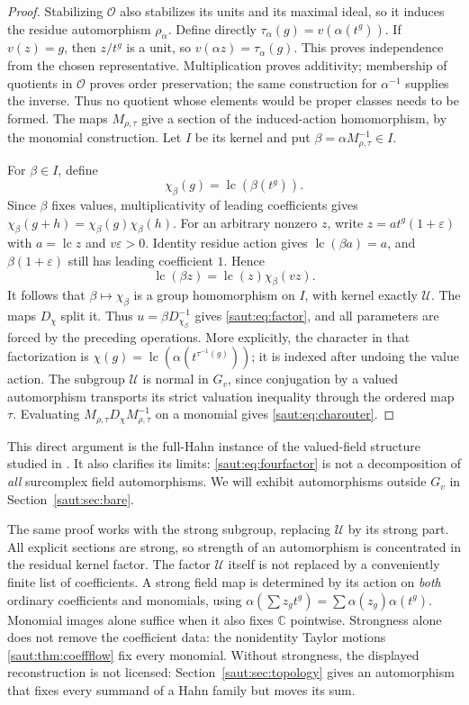 \documentclass[11pt]{article}
\theoremstyle{definition}
\theoremstyle{remark}
\newcommand{\C}{\mathbb C}
\newcommand{\OO}{\mathcal O}
\newcommand{\U}{\mathcal U}
\newcommand{\lc}{\operatorname{lc}}
\numberwithin{equation}{section}
\begin{document}
\begin{proof}
Stabilizing $\OO$ also stabilizes its units and its maximal ideal, so it
induces the residue automorphism $\rho_\alpha$. Define directly
$\tau_\alpha(g)=v(\alpha(t^g))$. If $v(z)=g$, then $z/t^g$ is a unit,
so $v(\alpha z)=\tau_\alpha(g)$. This proves independence from the chosen
representative. Multiplication proves additivity; membership of quotients
in $\OO$ proves order preservation; the same construction for
$\alpha^{-1}$ supplies the inverse. Thus no quotient whose elements would
be proper classes needs to be formed.
The maps $M_{\rho,\tau}$ give a section of the induced-action homomorphism,
by the monomial construction. Let $I$ be its kernel and put
$\beta=\alpha M_{\rho,\tau}^{-1}\in I$.

For $\beta\in I$, define
\[
 \chi_\beta(g)=\lc(\beta(t^g)).
\]
Since $\beta$ fixes values, multiplicativity of leading coefficients gives
$\chi_\beta(g+h)=\chi_\beta(g)\chi_\beta(h)$. For an arbitrary nonzero $z$,
write $z=a t^g(1+\varepsilon)$ with $a=\lc z$ and $v\varepsilon>0$.
Identity residue action gives $\lc(\beta a)=a$, and
$\beta(1+\varepsilon)$ still has leading coefficient $1$. Hence
\begin{equation}\label{saut:eq:internalLC}
 \lc(\beta z)=\lc(z)\chi_\beta(vz).
\end{equation}
It follows that $\beta\mapsto\chi_\beta$ is a group homomorphism on $I$,
with kernel exactly $\U$. The maps $D_\chi$ split it. Thus
$u=\beta D_{\chi_\beta}^{-1}$ gives \eqref{saut:eq:factor}, and all parameters
are forced by the preceding operations. More explicitly, the character in
that factorization is
$\chi(g)=\lc(\alpha(t^{\tau^{-1}(g)}))$; it is indexed after undoing the
value action. The subgroup $\U$ is normal in $G_v$, since conjugation by
a valued automorphism transports its strict valuation inequality through
the ordered map $\tau$. Evaluating
$M_{\rho,\tau}D_\chi M_{\rho,\tau}^{-1}$ on a monomial gives
\eqref{saut:eq:charouter}.
\end{proof}

This direct argument is the full-Hahn instance of the valued-field structure
studied in \cite{KS}. It also clarifies its limits: \eqref{saut:eq:fourfactor}
is not a decomposition of \emph{all} surcomplex field automorphisms. We will
exhibit automorphisms outside $G_v$ in Section~\ref{saut:sec:bare}.

The same proof works with the strong subgroup, replacing $\U$ by its strong
part. All explicit sections are strong, so strength of an automorphism
is concentrated in the residual kernel factor. The factor $\U$ itself is
not replaced by a conveniently finite list of coefficients. A strong field
map is determined by its action on \emph{both} ordinary coefficients and
monomials, using
$\alpha(\sum z_gt^g)=\sum\alpha(z_g)\alpha(t^g)$.
Monomial images alone suffice when it also fixes $\C$ pointwise.
Strongness alone does not remove the coefficient data: the nonidentity
Taylor motions \cref{saut:thm:coeffflow} fix every monomial. Without
strongness, the displayed reconstruction is not licensed:
Section~\ref{saut:sec:topology} gives an automorphism that fixes every
summand of a Hahn family but moves its sum.
\end{document}

